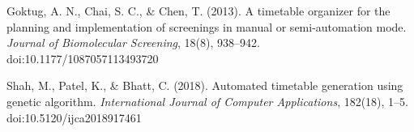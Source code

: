 \documentclass[12pt]{article}
\begin{document}
\newpage
 


  
%

\begin{thebibliography}{9}

Goktug, A. N., Chai, S. C., \& Chen, T. (2013). 
A timetable organizer for the planning and implementation of screenings in manual or semi-automation mode. 
\textit{Journal of Biomolecular Screening}, 18(8), 938--942. 
doi:10.1177/1087057113493720

Shah, M., Patel, K., \& Bhatt, C. (2018). 
Automated timetable generation using genetic algorithm. 
\textit{International Journal of Computer Applications}, 182(18), 1--5. 
doi:10.5120/ijca2018917461

\end{thebibliography}


 












\end{document}
